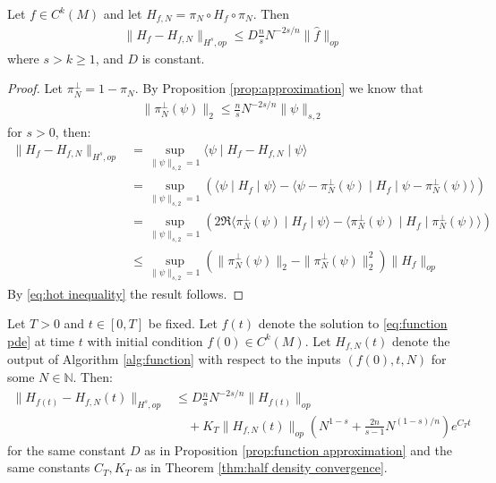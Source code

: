 \documentclass[final,leqno]{siamart}
\begin{document}
\begin{proposition} \label{prop:function approximation}
	Let $f \in C^{k}(M)$ and let $H_{f,N} = \pi_{N} \circ H_{f} \circ \pi_{N}$.  Then
	\begin{align*}
		\| H_{f} - H_{f,N} \|_{H^{s},op} \leq D \frac{n}{s} N^{-2s/n} \| \hat{f} \|_{op}
	\end{align*}
	where $s > k \geq 1$, and $D$ is constant.
\end{proposition}
\begin{proof}
	Let $\pi_{N}^{\perp} = 1 - \pi_{N}$.  By Proposition \ref{prop:approximation} we know that
	\begin{align}
		\| \pi_{N}^{\perp}(\psi) \|_{2} \leq \frac{n}{s} N^{-2s/n} \| \psi \|_{s,2} \label{eq:hot inequality}
	\end{align}
	for $s>0$, then:
	\begin{align*}
		\| H_{f} - H_{f,N} \|_{H^{s},op} &= \sup_{\| \psi \|_{s,2}=1} \langle \psi \mid H_{f} - H_{f,N} \mid \psi \rangle \\
			&= \sup_{\| \psi \|_{s,2}=1} \left( \langle \psi \mid H_{f}  \mid \psi \rangle - \langle \psi - \pi_{N}^{\perp}(\psi) \mid H_{f} \mid \psi - \pi_{N}^{\perp}(\psi) \rangle \right) \\
			&= \sup_{\| \psi \|_{s,2}=1} \left( 2 \Re \langle \pi_{N}^{\perp}(\psi) \mid H_{f} \mid \psi \rangle - \langle \pi_{N}^{\perp}(\psi) \mid H_{f} \mid \pi_{N}^{\perp}(\psi) \rangle \right) \\
			&\leq \sup_{\| \psi \|_{s,2}=1}  ( \| \pi_{N}^{\perp}(\psi) \|_{2}- \| \pi_{N}^{\perp}(\psi) \|_{2}^{2} ) \| H_{f} \|_{op} 
	\end{align*}
	By \eqref{eq:hot inequality} the result follows.
\end{proof}

\begin{theorem} \label{thm:function convergence}
	Let $T > 0$ and $t \in [0,T]$ be fixed.
	Let $f(t)$ denote the solution to \eqref{eq:function pde} at time $t$ with initial condition $f(0) \in C^{k}(M)$.
	Let $H_{f,N}(t)$ denote the output of Algorithm \ref{alg:function} with respect to the inputs $(f(0) , t  , N)$ for some $N \in \mathbb{N}$.
	Then:
	\begin{align*}
		\| H_{f(t)} - H_{f,N}(t) \|_{H^{s},op} &\leq D \frac{n}{s} N^{-2s/n} \| H_{f(t)} \|_{op} \\
			&\quad +  K_{T} \| H_{f,N}(t) \|_{op} \left( N^{1-s} + \frac{2n}{s -1} N^{(1-s)/n} \right) e^{C_{T}t}
	\end{align*}
	for the same constant $D$ as in Proposition \ref{prop:function approximation} and the same constants $C_{T},K_{T}$ as in Theorem \ref{thm:half density convergence}.
\end{theorem}
\end{document}
